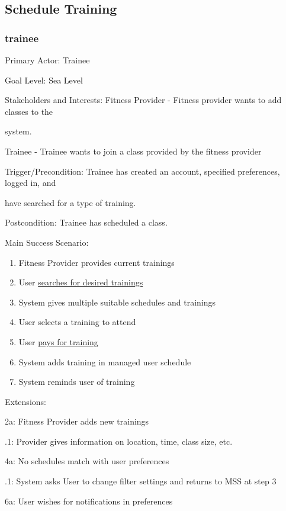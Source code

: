 \documentclass[12pt]{article}
\begin{document}
\subsection{Schedule Training}
\subsubsection{trainee}
\noindent Primary Actor: Trainee

\noindent Goal Level: Sea Level
\newline

\noindent Stakeholders and Interests: Fitness Provider - Fitness provider wants to add classes to the 

system.

\noindent Trainee - Trainee wants to join a class provided by the fitness provider
\newline

\noindent Trigger/Precondition: Trainee has created an account, specified preferences, logged in, and 

have searched for a type of training.

\noindent Postcondition: Trainee has scheduled a class.
\newline

\noindent Main Success Scenario:
\begin{enumerate}
\item Fitness Provider provides current trainings
\item User \underline{searches for desired trainings}
\item System gives multiple suitable schedules and trainings
\item User selects a training to attend
\item User \underline{pays for training}
\item System adds training in managed user schedule
\item System reminds user of training
\newline
\end{enumerate}
\noindent Extensions:

\noindent 2a: Fitness Provider adds new trainings

	.1: Provider gives information on location, time, class size, etc.

\noindent 4a: No schedules match with user preferences

	.1: System asks User to change filter settings and returns to MSS at step 3

\noindent 6a: User wishes for notifications in preferences
	
\end{document}
